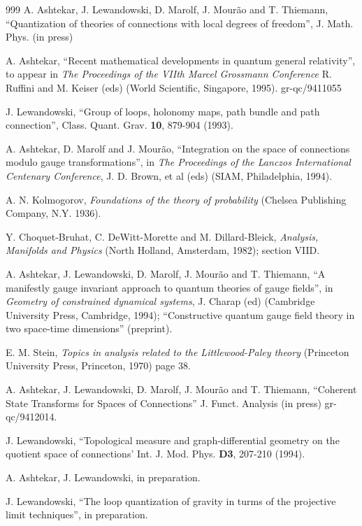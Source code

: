 \begin{thebibliography}{999}
 A. Ashtekar, J. Lewandowski, D. Marolf, J. Mour\~ao
and T. Thiemann, ``Quantization of theories of connections with local
degrees of freedom'', J. Math. Phys. (in press) 

 A. Ashtekar, ``Recent mathematical developments in
quantum general relativity'', to appear in {\it The Proceedings of the
VIIth Marcel Grossmann Conference} R. Ruffini and M. Keiser (eds)
(World Scientific, Singapore, 1995). gr-qc/9411055

 J. Lewandowski, ``Group of loops, holonomy maps, path
bundle and path connection'', Class. Quant. Grav. {\bf 10},
879-904 (1993).

 A. Ashtekar, D. Marolf and J. Mour\~ao, ``Integration on
the space of connections modulo gauge transformations'', in {\it The
Proceedings of the Lanczos International Centenary Conference}, J. D.
Brown, et al (eds) (SIAM, Philadelphia, 1994). 

 A. N. Kolmogorov, {\it Foundations of the theory of 
probability} (Chelsea Publishing Company, N.Y. 1936).

 Y. Choquet-Bruhat, C. DeWitt-Morette and M. Dillard-Bleick,
{\it Analysis, Manifolds and Physics} (North Holland, Amsterdam, 1982);
section VIID. 

 A. Ashtekar, J. Lewandowski, D. Marolf, J. Mour\~ao
and T. Thiemann, ``A manifestly gauge invariant approach to quantum
theories of gauge fields'', in {\it Geometry of constrained dynamical
systems}, J. Charap (ed) (Cambridge University Press, Cambridge,
1994); ``Constructive quantum gauge field theory in two space-time
dimensions'' (preprint).

 E. M. Stein, {\it Topics in analysis related to the 
Littlewood-Paley theory} (Princeton University Press, Princeton, 1970)
page 38.

 A. Ashtekar, J. Lewandowski, D. Marolf, J. Mour\~ao
and T. Thiemann, ``Coherent State Transforms for Spaces of Connections''
J. Funct. Analysis (in press) gr-qc/9412014.

 J. Lewandowski, ``Topological measure and 
graph-differential geometry on the quotient space of connections'
Int. J. Mod. Phys. {\bf D3}, 207-210 (1994).

  A. Ashtekar, J. Lewandowski, in preparation.

 J. Lewandowski, ``The loop quantization of gravity
in turms of the projective limit techniques'', in preparation.
\end{thebibliography} 


   











